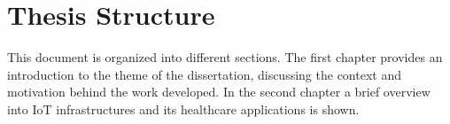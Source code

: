 

\section{Thesis Structure}

This document is organized into different sections. The first chapter provides an introduction to the theme of the dissertation, discussing the context and motivation behind the work developed. In the second chapter a brief overview into \acs{IoT} infrastructures and its healthcare applications is shown. 